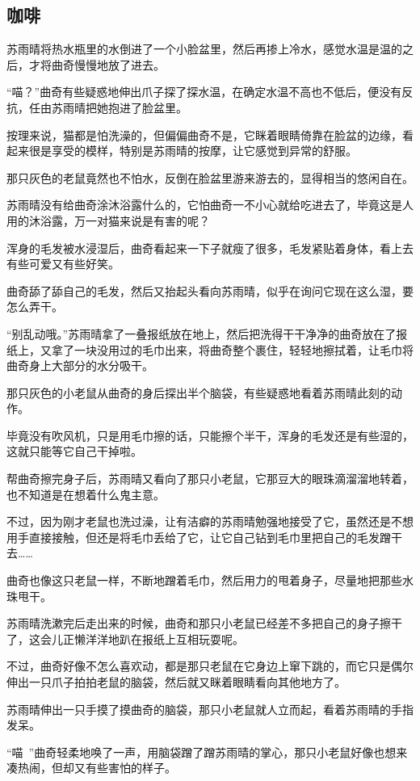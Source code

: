 \subsection{咖啡}

苏雨晴将热水瓶里的水倒进了一个小脸盆里，然后再掺上冷水，感觉水温是温的之后，才将曲奇慢慢地放了进去。

“喵？”曲奇有些疑惑地伸出爪子探了探水温，在确定水温不高也不低后，便没有反抗，任由苏雨晴把她抱进了脸盆里。

按理来说，猫都是怕洗澡的，但偏偏曲奇不是，它眯着眼睛倚靠在脸盆的边缘，看起来很是享受的模样，特别是苏雨晴的按摩，让它感觉到异常的舒服。

那只灰色的老鼠竟然也不怕水，反倒在脸盆里游来游去的，显得相当的悠闲自在。

苏雨晴没有给曲奇涂沐浴露什么的，它怕曲奇一不小心就给吃进去了，毕竟这是人用的沐浴露，万一对猫来说是有害的呢？

浑身的毛发被水浸湿后，曲奇看起来一下子就瘦了很多，毛发紧贴着身体，看上去有些可爱又有些好笑。

曲奇舔了舔自己的毛发，然后又抬起头看向苏雨晴，似乎在询问它现在这么湿，要怎么弄干。

“别乱动哦。”苏雨晴拿了一叠报纸放在地上，然后把洗得干干净净的曲奇放在了报纸上，又拿了一块没用过的毛巾出来，将曲奇整个裹住，轻轻地擦拭着，让毛巾将曲奇身上大部分的水分吸干。

那只灰色的小老鼠从曲奇的身后探出半个脑袋，有些疑惑地看着苏雨晴此刻的动作。

毕竟没有吹风机，只是用毛巾擦的话，只能擦个半干，浑身的毛发还是有些湿的，这就只能等它自己干掉啦。

帮曲奇擦完身子后，苏雨晴又看向了那只小老鼠，它那豆大的眼珠滴溜溜地转着，也不知道是在想着什么鬼主意。

不过，因为刚才老鼠也洗过澡，让有洁癖的苏雨晴勉强地接受了它，虽然还是不想用手直接接触，但还是将毛巾丢给了它，让它自己钻到毛巾里把自己的毛发蹭干去……

曲奇也像这只老鼠一样，不断地蹭着毛巾，然后用力的甩着身子，尽量地把那些水珠甩干。

苏雨晴洗漱完后走出来的时候，曲奇和那只小老鼠已经差不多把自己的身子擦干了，这会儿正懒洋洋地趴在报纸上互相玩耍呢。

不过，曲奇好像不怎么喜欢动，都是那只老鼠在它身边上窜下跳的，而它只是偶尔伸出一只爪子拍拍老鼠的脑袋，然后就又眯着眼睛看向其他地方了。

苏雨晴伸出一只手摸了摸曲奇的脑袋，那只小老鼠就人立而起，看着苏雨晴的手指发呆。

“喵~”曲奇轻柔地唤了一声，用脑袋蹭了蹭苏雨晴的掌心，那只小老鼠好像也想来凑热闹，但却又有些害怕的样子。

